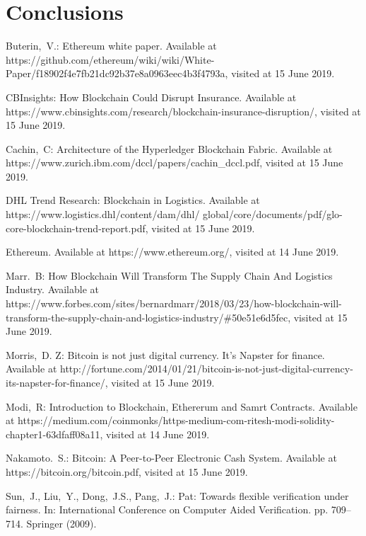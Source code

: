 \documentclass{KERauth}
\begin{document}
\section{Conclusions}


\begin{thebibliography}
\item Buterin,~V.: Ethereum white paper. Available at https://github.com/ethereum/wiki/wiki/White-Paper/f18902f4e7fb21dc92b37e8a0963eec4b3f4793a, visited at 15 June 2019.

\item CBInsights: How Blockchain Could Disrupt Insurance. Available at https://www.cbinsights.com/research/blockchain-insurance-disruption/, visited at 15 June 2019.

\item Cachin,~C: Architecture of the Hyperledger Blockchain Fabric. Available at https://www.zurich.ibm.com/dccl/papers/cachin\_dccl.pdf, visited at 15 June 2019.

\item DHL Trend Research: Blockchain in Logistics. Available at https://www.logistics.dhl/content/dam/dhl/
global/core/documents/pdf/glo-core-blockchain-trend-report.pdf, visited at 15 June 2019.

\item Ethereum. Available at https://www.ethereum.org/, visited at 14 June 2019.

\item Marr.~B: How Blockchain Will Transform The Supply Chain And Logistics Industry. Available at https://www.forbes.com/sites/bernardmarr/2018/03/23/how-blockchain-will-transform-the-supply-chain-and-logistics-industry/\#50e51e6d5fec, visited at 15 June 2019.

\item Morris,~D. Z: Bitcoin is not just digital currency. It's Napster for finance. Available at http://fortune.com/2014/01/21/bitcoin-is-not-just-digital-currency-its-napster-for-finance/, visited at 15 June 2019.

\item Modi,~R: Introduction to Blockchain, Ethererum and Samrt Contracts. Available at https://medium.com/coinmonks/https-medium-com-ritesh-modi-solidity-chapter1-63dfaff08a11, visited at 14 June 2019.
\item Nakamoto.~S.: Bitcoin: A Peer-to-Peer Electronic Cash System. Available at https://bitcoin.org/bitcoin.pdf, visited at 15 June 2019.
\item Sun,~J., Liu,~Y., Dong,~J.S., Pang,~J.: Pat: Towards flexible verification under
fairness. In: International Conference on Computer Aided Verification. pp. 709–
714. Springer (2009).


\end{thebibliography}
\end{document}
